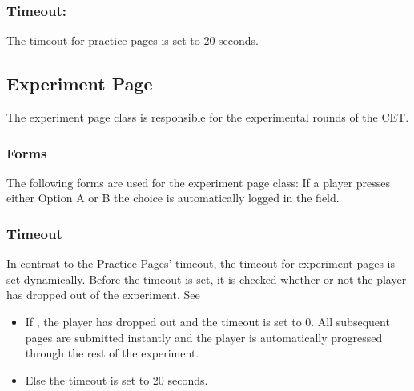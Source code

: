 \documentclass[letterpaper,10pt,english]{sphinxmanual}
\begin{document}
\subsubsection{Timeout:}
\label{\detokenize{pages:id2}}
The timeout for practice pages is set to 20 seconds.


\subsection{Experiment Page}
\label{\detokenize{pages:experiment-page}}\label{\detokenize{pages:exp-page}}
The experiment page class is responsible for the experimental rounds of the CET.


\subsubsection{Forms}
\label{\detokenize{pages:id3}}
The following forms are used for the experiment page class:
If a player presses either Option A or B the choice is automatically logged in the  field.

\begin{sphinxVerbatim}[commandchars=\\\{\}]
 
      
      \PYG{p}{[}\PYG{p}{]}  
\end{sphinxVerbatim}


\subsubsection{Timeout}
\label{\detokenize{pages:timeout-ref}}\label{\detokenize{pages:id4}}
In contrast to the Practice Pages’ timeout, the timeout for experiment pages is set dynamically.
Before the timeout is set, it is checked whether or not the player has dropped out of the experiment. See {\hyperref[\detokenize{Player_fields:is-dropout-ref}]{}}
\begin{itemize}
\item {} 
If , the player has dropped out and the timeout is set to 0. All subsequent pages
are submitted instantly and the player is automatically progressed through the rest of the experiment.

\item {} 
Else the timeout is set to 20 seconds.

\end{itemize}
\end{document}
